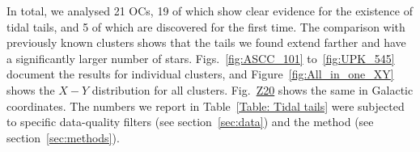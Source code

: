 \documentclass{aa}
\newcommand{\vik}[1]{{\color{red} #1}}
\begin{document}

In total, we analysed 21 OCs, 19 of which show clear evidence for the existence of tidal tails, and 5 of which are discovered for the first time. The comparison with previously known clusters shows that the tails we found extend farther and have a significantly larger number of stars. Figs.~\ref{fig:ASCC_101} to~\ref{fig:UPK_545} document the results for individual clusters, and Figure~\ref{fig:All_in_one_XY} shows the $X-Y$ distribution for all clusters. Fig.~\href{https://doi.org/10.5281/zenodo.14651597}{Z20} shows the same in Galactic coordinates. The numbers we report in Table~\ref{Table: Tidal tails} were subjected to specific data-quality filters (see section~\ref{sec:data}) and the method (see section~\ref{sec:methods}).
\end{document}
